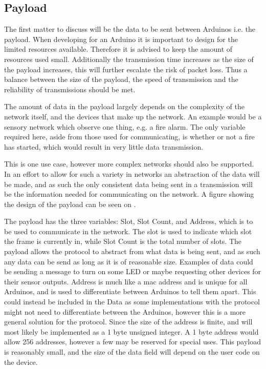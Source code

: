 \subsection{Payload}
The first matter to discuss will be the data to be sent between Arduinos i.e. the payload.
When developing for an Arduino it is important to design for the limited resources available.
Therefore it is advised to keep the amount of resources used small.
Additionally the transmission time increases as the size of the payload increases, this will further escalate the risk of packet loss. 
Thus a balance between the size of the payload, the speed of transmission and the reliability of transmissions should be met. 

\bigskip 
The amount of data in the payload largely depends on the complexity of the network itself, and the devices that make up the network.
An example would be a sensory network which observe one thing, e.g. a fire alarm. 
The only variable required here, aside from those used for communicating, is whether or not a fire has started, which would result in very little data transmission.

This is one use case, however more complex networks should also be supported. 
In an effort to allow for such a variety in networks an abstraction of the data will be made, and as such the only consistent data being sent in a transmission will be the information needed for communicating on the network.
A figure showing the design of the payload can be seen on .

\bigskip

The payload has the three variables: Slot, Slot Count, and Address, which is to be used to communicate in the network.
The slot is used to indicate which slot the frame is currently in, while Slot Count is the total number of slots.
The payload allows the protocol to abstract from what data is being sent, and as such any data can be send as long as it is of reasonable size. 
Examples of data could be sending a message to turn on some LED or maybe requesting other devices for their sensor outputs.
Address is much like a mac address and is unique for all Arduinos, and is used to differentiate between Arduinos to tell them apart.
This could instead be included in the Data as some implementations with the protocol might not need to differentiate between the Arduinos, however this is a more general solution for the protocol.
Since the size of the address is finite, and will most likely be implemented as a 1 byte unsigned integer. 
A 1 byte address would allow 256 addresses, however a few may be reserved for special uses.
This payload is reasonably small, and the size of the data field will depend on the user code on the device.

